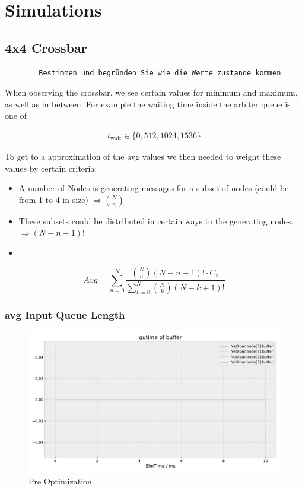 \documentclass[]{scrartcl}
\begin{document}
    \section{Simulations}
    \subsection{4x4 Crossbar}
    \begin{verbatim}
        Bestimmen und begründen Sie wie die Werte zustande kommen
    \end{verbatim}

    When observing the crossbar, we see certain values for minimum and maximum, as well as in between. For example the waiting time inside the arbiter queue is one of

    \begin{align}
        t_\text{wait} \in \{ 0, 512, 1024, 1536 \}
    \end{align}

    To get to a approximation of the avg values we then needed to weight these values by certain criteria:

    \begin{itemize}
        \item A number of Nodes is generating messages for a subset of nodes (could be from 1 to 4 in size) $\Rightarrow \binom{N}{n}$
        \item These subsets could be distributed in certain ways to the generating nodes. $\Rightarrow (N-n+1)!$
        \item 
    \end{itemize}

    \begin{equation}
        Avg = \sum_{n=0}^N \frac{\binom{N}{n}\left( N-n+1 \right)! \cdot C_n }{\sum_{k=0}^N \binom{N}{k}\left( N-k+1 \right)!}
    \end{equation}

    \subsubsection{avg Input Queue Length}
        \begin{figure}[ht]
            \centering
            \includegraphics[width=\columnwidth, page=2]{../../python/results/preopt-General-0}
            \caption{Pre Optimization}%
            \label{fig:}
        \end{figure}
\end{document}

